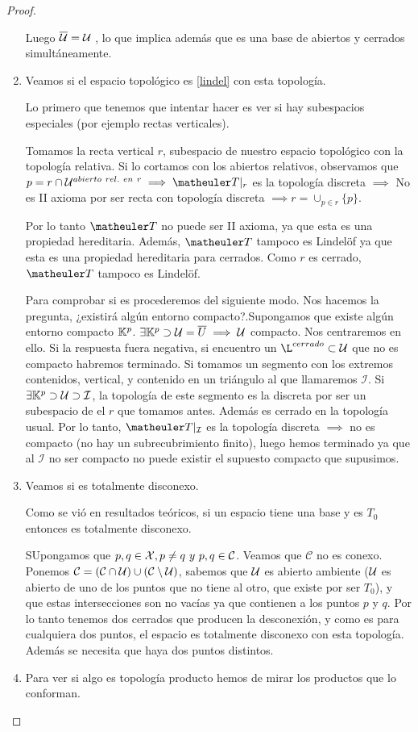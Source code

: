 \begin{proof}
\begin{enumerate}
		Luego  $\overline{\mathcal{U}} = \mathcal{U}$ , lo que implica además que es una base de abiertos y cerrados simultáneamente.
		
		\item Veamos si el espacio topológico es  \ref{lindel} con esta topología.
		
		Lo primero que tenemos que intentar hacer es ver si hay subespacios especiales (por ejemplo rectas verticales).
		
		Tomamos la recta vertical $r$, subespacio de nuestro espacio topológico con la topología relativa. Si lo cortamos con los abiertos relativos, observamos que $p = r \cap \U^{abierto\ rel.\ en\ r} \implies \T|_r$ es la topología discreta $\implies$ No es II axioma por ser recta con topología discreta $\implies r= \cup_{p\in r}\{p\}$.
		
		Por lo tanto $\T$ no puede ser II axioma, ya que esta es una propiedad hereditaria. Además, $\T$ tampoco es Lindelöf ya que esta es una propiedad hereditaria para cerrados. Como $r$ es cerrado, $\T$ tampoco es Lindelöf.
		
		Para comprobar si es  procederemos del siguiente modo. Nos hacemos la pregunta, ¿existirá algún entorno compacto?.Supongamos que existe algún entorno compacto $\mathbb{K}^p$. $\exists \mathbb{K}^p \supset \mathcal{U} = \overline{U} \implies \mathcal{U}$ compacto. Nos centraremos en ello.
		Si la respuesta fuera negativa, si encuentro un $\L^{cerrado} \subset \U$ que no es compacto habremos terminado.
		Si tomamos un segmento con los extremos contenidos, vertical, y contenido en un triángulo al que llamaremos $\mathcal{I}$. Si $\exists \mathbb{K}^p \supset \mathcal{U} \supset \mathcal{I}$, la topología de este segmento es la discreta por ser un subespacio de el $r$ que tomamos antes. Además es cerrado en la topología usual. Por lo tanto, $\T|_\mathcal{I}$ es la topología discreta $\implies$ no es compacto (no hay un subrecubrimiento finito), luego hemos terminado ya que al $\mathcal{I}$ no ser compacto no puede existir el supuesto compacto que supusimos.
		\item Veamos si es totalmente disconexo.
		
		Como se vió en resultados teóricos, si un espacio tiene una base  y es $T_0$ entonces es totalmente disconexo.
		
		SUpongamos que $p,q \in \X, p \neq q\ y\ p,q \in \mathcal{C}$. Veamos que $\mathcal{C}$ no es conexo. Ponemos $\mathcal{C} = (\mathcal{C} \cap \mathcal{U}) \cup (\mathcal{C} \setminus \mathcal{U})$, sabemos que $\mathcal{U}$ es abierto ambiente ($\mathcal{U}$ es abierto de uno de los puntos que no tiene al otro, que existe por ser $T_0$), y que estas intersecciones son no vacías ya que contienen a los puntos $p$ y $q$. Por lo tanto tenemos dos cerrados que producen la desconexión, y como es para cualquiera dos puntos, el espacio es totalmente disconexo con esta topología. Además se necesita que haya dos puntos distintos.
	
		\item Para ver si algo es topología producto hemos de mirar los productos que lo conforman.
	\end{enumerate}	
\end{proof}
